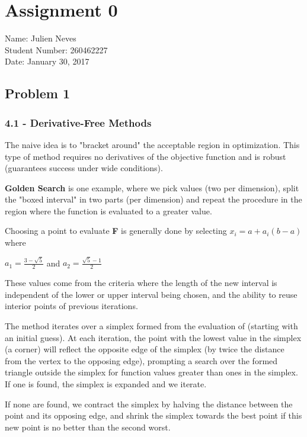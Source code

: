 \documentclass{article}
\begin{document}
\section*{Assignment 0}
Name: Julien Neves
\\Student Number: 260462227
\\Date: January 30, 2017

\subsection*{Problem 1}

\subsubsection*{4.1 - Derivative-Free Methods}

The naive idea is to "bracket around" the acceptable region in optimization. This type of method requires no derivatives of the objective function and is robust (guarantees success under wide conditions).

\textbf{Golden Search} is one example, where we pick values (two per dimension), split the "boxed interval" in two parts (per dimension) and repeat the procedure in the region where the function is evaluated to a greater value. 

Choosing a point to evaluate \textbf{F} is generally done by selecting $x_i = a + a_i (b-a)$ where 

$ a_1 = \frac{3-\sqrt{5}}{2} $ and $a_2 = \frac{\sqrt{5} - 1}{2}$

These values come from the criteria where the length of the new interval is independent of the lower or upper interval being chosen, and the ability to reuse interior points of previous iterations.

The  method iterates over a simplex formed from the evaluation of  (starting with an initial guess). At each iteration, the point with the lowest value in the simplex (a corner) will reflect the opposite edge of the simplex (by twice the distance from the vertex to the opposing edge), prompting a search over the formed triangle outside the simplex for function values greater than ones in the simplex. If one is found, the simplex is expanded and we iterate.

If none are found, we contract the simplex by halving the distance between the point and its opposing edge, and shrink the simplex towards the best point if this new point is no better than the second worst. 
\end{document}
